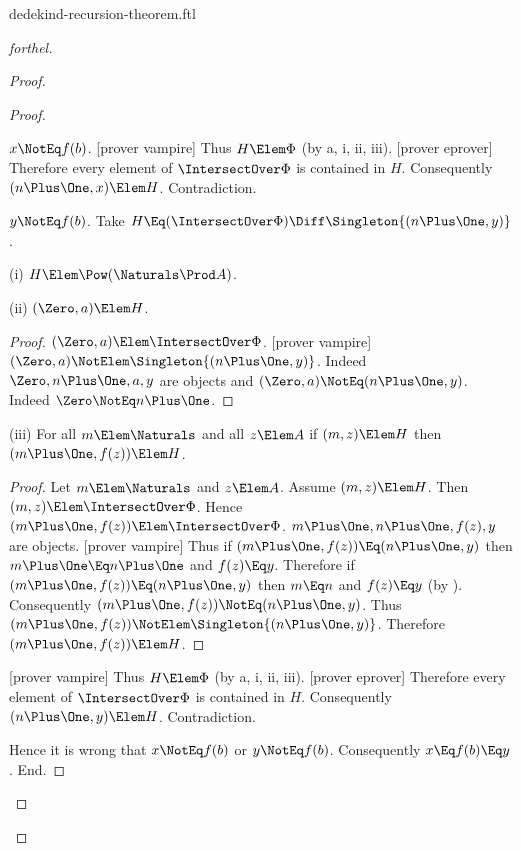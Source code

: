 \documentclass{stex}
\begin{document}
\begin{smodule}{dedekind-recursion-theorem.ftl}
\begin{proof}[forthel]
\begin{proof}
\begin{proof}
\begin{case}{$x \NotEq f(b)$.}
          [prover vampire]
          Thus $H \Elem \Phi$ (by a, i, ii, iii).
          [prover eprover]
          Therefore every element of $\IntersectOver \Phi$ is contained in $H$.
          Consequently $(n \Plus \One,x) \Elem H$.
          Contradiction.
        \end{case}

        \begin{case}{$y \NotEq f(b)$.}
          Take $H \Eq (\IntersectOver \Phi) \Diff \Singleton{(n \Plus \One,y)}$.

          (i) $H \Elem \Pow(\Naturals \Prod A)$.

          (ii) $(\Zero,a) \Elem H$.
          \begin{proof}
            $(\Zero,a) \Elem \IntersectOver \Phi$.
            [prover vampire]
            $(\Zero,a) \NotElem \Singleton{(n \Plus \One,y)}$.
            Indeed $\Zero, n \Plus \One, a, y$ are objects and $(\Zero,a) \NotEq (n \Plus \One,y)$.
            Indeed $\Zero \NotEq n \Plus \One$.
          \end{proof}

          (iii) For all $m \Elem \Naturals$ and all $z \Elem A$ if $(m,z) \Elem H$ then $(m \Plus \One,f(z)) \Elem H$.
          \begin{proof}
            Let $m \Elem \Naturals$ and $z \Elem A$.
            Assume $(m,z) \Elem H$.
            Then $(m,z) \Elem \IntersectOver \Phi$.
            Hence $(m \Plus \One,f(z)) \Elem \IntersectOver \Phi$.
            $m \Plus \One, n \Plus \One, f(z), y$ are objects.
            [prover vampire]
            Thus if $(m \Plus \One,f(z)) \Eq (n \Plus \One,y)$ then $m \Plus \One \Eq n \Plus \One$ and $f(z) \Eq y$.
            Therefore if $(m \Plus \One,f(z)) \Eq (n \Plus \One,y)$ then $m \Eq n$ and $f(z) \Eq y$ (by ).
            Consequently $(m \Plus \One,f(z)) \NotEq (n \Plus \One,y)$.
            Thus $(m \Plus \One,f(z)) \NotElem \Singleton{(n \Plus \One,y)}$.
            Therefore $(m \Plus \One,f(z)) \Elem H$.
          \end{proof}

          [prover vampire]
          Thus $H \Elem \Phi$ (by a, i, ii, iii).
          [prover eprover]
          Therefore every element of $\IntersectOver \Phi$ is contained in $H$.
          Consequently $(n \Plus \One,y) \Elem H$.
          Contradiction.
        \end{case}

        Hence it is wrong that $x \NotEq f(b)$ or $y \NotEq f(b)$.
        Consequently $x \Eq f(b) \Eq y$.
      End.


\end{proof}
\end{proof}
\end{proof}
\end{smodule}
\end{document}
